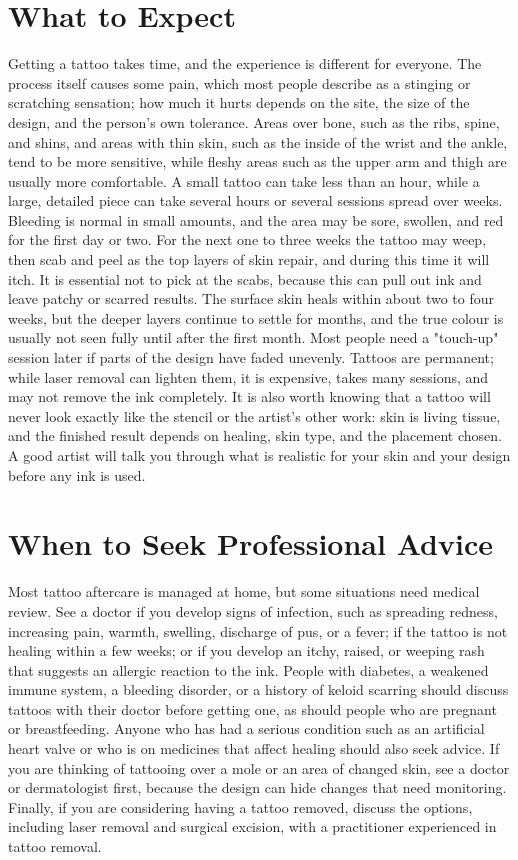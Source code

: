 \section*{What to Expect}
Getting a tattoo takes time, and the experience is different for everyone. The process itself causes some pain, which most people describe as a stinging or scratching sensation; how much it hurts depends on the site, the size of the design, and the person's own tolerance. Areas over bone, such as the ribs, spine, and shins, and areas with thin skin, such as the inside of the wrist and the ankle, tend to be more sensitive, while fleshy areas such as the upper arm and thigh are usually more comfortable. A small tattoo can take less than an hour, while a large, detailed piece can take several hours or several sessions spread over weeks. Bleeding is normal in small amounts, and the area may be sore, swollen, and red for the first day or two. For the next one to three weeks the tattoo may weep, then scab and peel as the top layers of skin repair, and during this time it will itch. It is essential not to pick at the scabs, because this can pull out ink and leave patchy or scarred results. The surface skin heals within about two to four weeks, but the deeper layers continue to settle for months, and the true colour is usually not seen fully until after the first month. Most people need a "touch-up" session later if parts of the design have faded unevenly. Tattoos are permanent; while laser removal can lighten them, it is expensive, takes many sessions, and may not remove the ink completely. It is also worth knowing that a tattoo will never look exactly like the stencil or the artist's other work: skin is living tissue, and the finished result depends on healing, skin type, and the placement chosen. A good artist will talk you through what is realistic for your skin and your design before any ink is used.

\section*{When to Seek Professional Advice}
Most tattoo aftercare is managed at home, but some situations need medical review. See a doctor if you develop signs of infection, such as spreading redness, increasing pain, warmth, swelling, discharge of pus, or a fever; if the tattoo is not healing within a few weeks; or if you develop an itchy, raised, or weeping rash that suggests an allergic reaction to the ink. People with diabetes, a weakened immune system, a bleeding disorder, or a history of keloid scarring should discuss tattoos with their doctor before getting one, as should people who are pregnant or breastfeeding. Anyone who has had a serious condition such as an artificial heart valve or who is on medicines that affect healing should also seek advice. If you are thinking of tattooing over a mole or an area of changed skin, see a doctor or dermatologist first, because the design can hide changes that need monitoring. Finally, if you are considering having a tattoo removed, discuss the options, including laser removal and surgical excision, with a practitioner experienced in tattoo removal.

